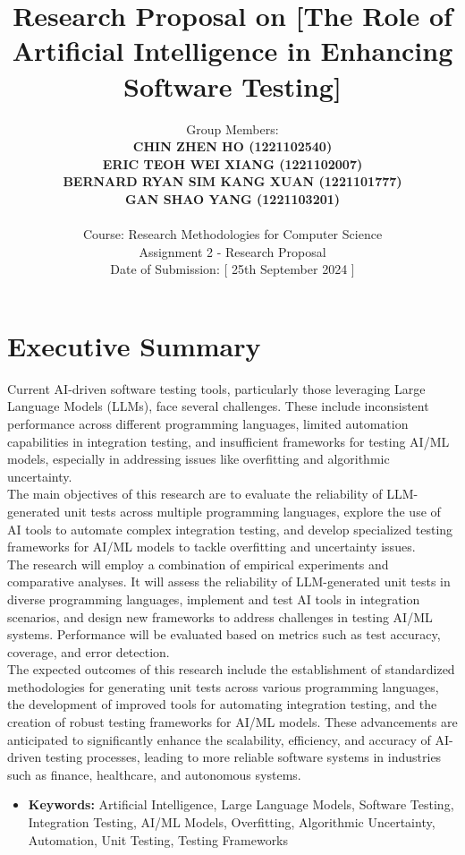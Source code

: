 \documentclass[12pt,a4paper]{article}
\title{Research Proposal  on [The Role of Artificial Intelligence in Enhancing Software Testing]}
\author{Group Members: \\
\textbf{CHIN ZHEN HO (1221102540)} \\
\textbf{ERIC TEOH WEI XIANG (1221102007)} \\
\textbf{BERNARD RYAN SIM KANG XUAN (1221101777)} \\
\textbf{GAN SHAO YANG (1221103201)} \\
\\
Course: Research Methodologies for Computer Science \\
Assignment 2 - Research Proposal  \\
Date of Submission: [ 25th September 2024 ]}
\date{}
\begin{document}
\maketitle
\newpage


\tableofcontents
\newpage

\section{Executive Summary}

    Current AI-driven software testing tools, particularly those leveraging Large Language Models (LLMs), face several challenges. These include inconsistent performance across different programming languages, limited automation capabilities in integration testing, and insufficient frameworks for testing AI/ML models, especially in addressing issues like overfitting and algorithmic uncertainty.\\

    The main objectives of this research are to evaluate the reliability of LLM-generated unit tests across multiple programming languages, explore the use of AI tools to automate complex integration testing, and develop specialized testing frameworks for AI/ML models to tackle overfitting and uncertainty issues.\\

    The research will employ a combination of empirical experiments and comparative analyses. It will assess the reliability of LLM-generated unit tests in diverse programming languages, implement and test AI tools in integration scenarios, and design new frameworks to address challenges in testing AI/ML systems. Performance will be evaluated based on metrics such as test accuracy, coverage, and error detection.\\

    The expected outcomes of this research include the establishment of standardized methodologies for generating unit tests across various programming languages, the development of improved tools for automating integration testing, and the creation of robust testing frameworks for AI/ML models. These advancements are anticipated to significantly enhance the scalability, efficiency, and accuracy of AI-driven testing processes, leading to more reliable software systems in industries such as finance, healthcare, and autonomous systems.
\begin{itemize} 
    \item \textbf{Keywords:} Artificial Intelligence, Large Language Models, Software Testing, Integration Testing, AI/ML Models, Overfitting, Algorithmic Uncertainty, Automation, Unit Testing, Testing Frameworks
\end{itemize}
\end{document}
